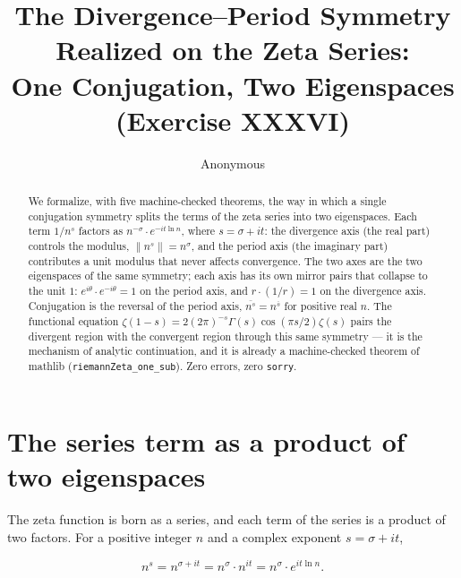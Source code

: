 \documentclass[sigplan,10pt,anonymous,review]{acmart}
\begin{document}
\title{The Divergence--Period Symmetry Realized on the Zeta Series:\\
One Conjugation, Two Eigenspaces (Exercise XXXVI)}

\author{Anonymous}

\begin{abstract}
We formalize, with five machine-checked theorems, the way in which a
single conjugation symmetry splits the terms of the zeta series into
two eigenspaces. Each term $1/n^s$ factors as $n^{-\sigma} \cdot
e^{-it\ln n}$, where $s = \sigma + it$: the divergence axis (the real
part) controls the modulus, $\|n^s\| = n^{\sigma}$, and the period axis
(the imaginary part) contributes a unit modulus that never affects
convergence. The two axes are the two eigenspaces of the same
symmetry; each axis has its own mirror pairs that collapse to the unit
$1$: $e^{i\theta} \cdot e^{-i\theta} = 1$ on the period axis, and
$r \cdot (1/r) = 1$ on the divergence axis. Conjugation is the reversal
of the period axis, $\overline{n^s} = n^{\overline{s}}$ for positive
real $n$. The functional equation
$\zeta(1-s) = 2(2\pi)^{-s}\Gamma(s)\cos(\pi s/2)\zeta(s)$ pairs the
divergent region with the convergent region through this same symmetry
--- it is the mechanism of analytic continuation, and it is already a
machine-checked theorem of mathlib
(\texttt{riemannZeta\_one\_sub}). Zero errors, zero \texttt{sorry}.
\end{abstract}


\maketitle

\section{The series term as a product of two eigenspaces}

The zeta function is born as a series, and each term of the series is a
product of two factors. For a positive integer $n$ and a complex
exponent $s = \sigma + it$,

\begin{equation*}
  n^s = n^{\sigma + it} = n^{\sigma} \cdot n^{it}
      = n^{\sigma} \cdot e^{it \ln n}.
\end{equation*}
\end{document}

